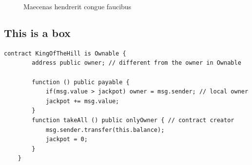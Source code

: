 \begin{figure}[ht]
	\caption{Maecenas hendrerit congue faucibus} \label{fig:duis}
\end{figure}

\newpage

\begin{outline}
	\lipsum[2]
\end{outline}


\subsection*{This is a box}

\begin{lstlisting}[language=Solidity]
	contract KingOfTheHill is Ownable {
		address public owner; // different from the owner in Ownable
		
		function () public payable {
			if(msg.value > jackpot) owner = msg.sender; // local owner
			jackpot += msg.value;
		}
		function takeAll () public onlyOwner { // contract creator
			msg.sender.transfer(this.balance);
			jackpot = 0;
		}
	}
\end{lstlisting}



